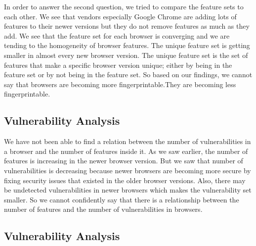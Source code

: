 In order to answer the second question, we tried to compare the feature sets to each other. We see that vendors especially Google Chrome are adding lots of features to their newer versions but they do not remove features as much as they add. We see that the feature set for each browser is converging and we are tending to the homogeneity of browser features. The unique feature set is getting smaller in almost every new browser version. The unique feature set is the set of features that make a specific browser version unique; either by being in the feature set or by not being in the feature set. 
So based on our findings, we cannot say that browsers are becoming more fingerprintable.They are becoming less fingerprintable.




\subsection{Vulnerability Analysis}
We have not been able to find a relation between the number of vulnerabilities in a browser and the number of features inside it. As we saw earlier, the number of features is increasing in the newer browser version. But we saw that number of vulnerabilities is decreasing because newer browsers are becoming more secure by fixing security issues that existed in the older browser versions. Also, there may be undetected vulnerabilities in newer browsers which makes the vulnerability set smaller. So we cannot confidently say that there is a relationship between the number of features and the number of vulnerabilities in browsers.



\subsection{Vulnerability Analysis}
